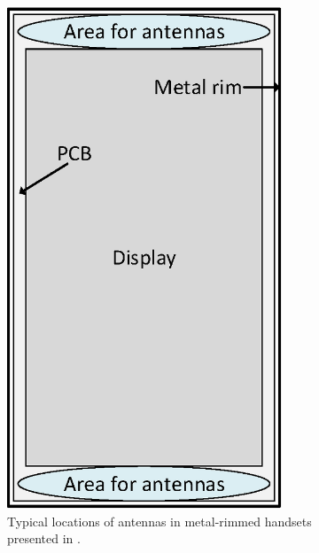 \begin{figure}[ht!]
\centering
    \begin{subfigure}[b]{0.4\textwidth}
        \includegraphics[width=0.9\textwidth]{img/metal_rim.eps}
        \caption{Typical locations of antennas in metal-rimmed handsets presented in \cite{ban_low_profile}.}
        \label{fig:metal_rim}
    \end{subfigure}
    \hspace{20pt}
    \begin{subfigure}[b]{0.4\textwidth}

\end{subfigure}
\end{figure}
